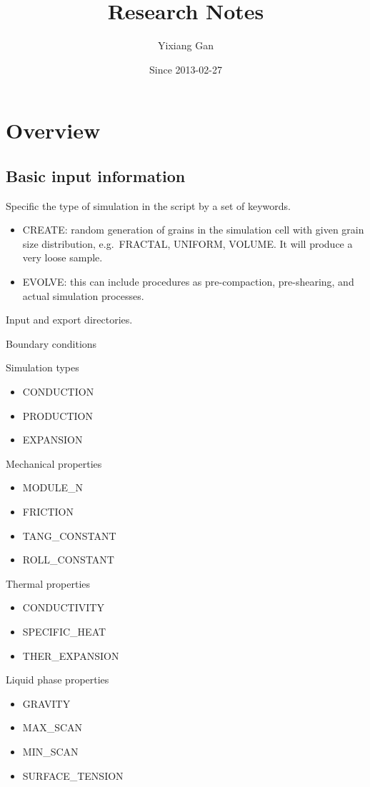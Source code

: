 \documentclass[11pt, a4paper]{report}
\title{Research Notes}
\author{Yixiang Gan}
\date{Since 2013-02-27}
\begin{document}

\chapter{Overview}
\section{Basic input information}

Specific the type of simulation in the script by a set of keywords.

\begin{itemize}\itemsep -2pt
 \item CREATE: random generation of grains in the simulation cell with given grain size distribution, e.g.\ FRACTAL, UNIFORM, VOLUME. It will produce a very loose sample.
 \item EVOLVE: this can include procedures as pre-compaction, pre-shearing, and actual simulation processes.
\end{itemize}

Input and export directories.

Boundary conditions

Simulation types
\begin{itemize} \itemsep -2pt
 \item CONDUCTION
 \item PRODUCTION
 \item EXPANSION
\end{itemize}

Mechanical properties
\begin{itemize}\itemsep -2pt
 \item MODULE\_N
 \item FRICTION 
 \item TANG\_CONSTANT
 \item ROLL\_CONSTANT
\end{itemize}

Thermal properties
\begin{itemize}\itemsep -2pt
 \item CONDUCTIVITY	
 \item SPECIFIC\_HEAT
 \item THER\_EXPANSION
\end{itemize}

Liquid phase properties
\begin{itemize}\itemsep -2pt
 \item GRAVITY
 \item MAX\_SCAN
 \item MIN\_SCAN
 \item SURFACE\_TENSION
\end{itemize}
\end{document}
